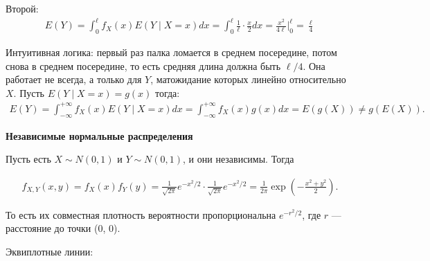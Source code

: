 \documentclass[12pt]{article}
\begin{document}
Второй:
\begin{align*}
  E(Y) = \int_0^\ell f_X(x) E(Y \mid X = x) dx = \int_0^\ell \frac{1}{\ell} \cdot \frac{x}{2} dx = \frac{x^2}{4\ell} \bigg|_0^\ell = \frac{\ell}{4}
\end{align*}

Интуитивная логика: первый раз палка ломается в среднем посередине, потом снова в среднем посередине, то есть средняя длина должна быть $\ell / 4$. Она работает не всегда, а только для $Y$, матожидание которых линейно относительно $X$. Пусть $E(Y \mid X = x) = g(x)$ тогда:
\begin{align*}
  E(Y) = \int_{-\infty}^{+\infty} f_X(x) E(Y \mid X = x) dx = \int_{-\infty}^{+\infty} f_X(x) g(x) dx = E(g(X)) \ne g(E(X)).
\end{align*}

\textbf{Независимые нормальные распределения}

Пусть есть $X \sim N(0, 1)$ и $Y \sim N(0, 1)$, и они независимы. Тогда

\begin{align*}
  f_{X, Y}(x, y) = f_X(x) f_Y(y) = \frac{1}{\sqrt{2\pi}} e^{-x^2/2} \cdot \frac{1}{\sqrt{2\pi}} e^{-x^2/2} = \frac{1}{2\pi} \exp\left(-\frac{x^2 + y^2}{2}\right).
\end{align*}

То есть их совместная плотность вероятности пропорциональна $e^{-r^2/2}$, где $r$ --- расстояние до точки (0, 0). 

\begin{center}
\end{center}

Эквиплотные линии:

\begin{center}
\end{center}
\end{document}
